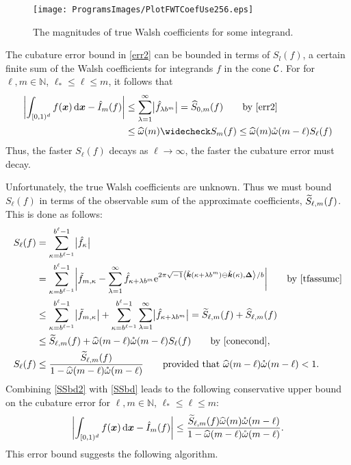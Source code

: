 \documentclass[graybox,footinfo]{svmult}
\newcommand{\N}{\mathbb{N}} %
\newcommand{\bsx}{\boldsymbol{x}}    %
\newcommand{\bsDelta}{\boldsymbol{\Delta}}    %
\begin{document}
\begin{figure}
\centering
\texttt{[image: ProgramsImages/PlotFWTCoefUse256.eps]}
\caption{The magnitudes of true Walsh coefficients for some integrand. \label{Walshcoeffig}}
\end{figure}

The cubature error bound in \eqref{err2} can be bounded in terms of $S_l(f)$, a certain finite sum of the Walsh coefficients for integrands $f$ in the cone $\mathcal{C}$.  For for $\ell, m \in \N$, $\ell_* \le \ell \le m$, it follows that 
\begin{align}
\nonumber
\biggabs{\int_{\cube} f(\bsx) \, \D \bsx - \hI_m(f) }
&\le \sum_{\lambda=1}^{\infty} \bigabs{\hf_{\lambda b^{m}}} 
= \hS_{0,m}(f) \qquad \text{by \eqref{err2}} \\
& \le \homega(m) \wcS_m(f) \le \homega(m) \wcomega(m-\ell) S_\ell(f) \label{SSbd2}
\end{align}
Thus, the faster $S_\ell(f)$ decays as $\ell \to \infty$, the faster the cubature error must decay.

Unfortunately, the true Walsh coefficients are unknown.  Thus we must bound $S_\ell(f)$ in terms of the observable sum of the approximate coefficients, $\widetilde{S}_{\ell,m}(f)$.  This is done as follows:
\begin{align}
\nonumber
S_\ell(f) &= \sum_{\kappa=b^{\ell-1}}^{b^{\ell}-1} \bigabs{ \hf_{\kappa}} \\
\nonumber
&= \sum_{\kappa=b^{\ell-1}}^{b^{\ell}-1} \biggabs{\tf_{m,\kappa} - \sum_{\lambda=1}^{\infty} \hf_{\kappa+\lambda b^{m}} \E^{2 \pi \sqrt{-1} \ip{\tvk(\kappa+\lambda b^{m}) \ominus \tvk(\kappa)}{\bsDelta}/b}} \qquad \text{by \eqref{tfassumc}}\\
\nonumber
&\le \sum_{\kappa=b^{\ell-1}}^{b^{\ell}-1} \bigabs{\tf_{m,\kappa}} + \sum_{\kappa=b^{\ell-1}}^{b^{\ell}-1} \sum_{\lambda=1}^{\infty} \bigabs{\hf_{\kappa+\lambda b^{m}}} 
= \tS_{\ell,m}(f) + \hS_{\ell,m}(f) \\
\nonumber
&\le \tS_{\ell,m}(f) + \homega(m-\ell) \wcomega(m-\ell) S_\ell(f) \qquad \text{by \eqref{conecond}}, \\
S_{\ell}(f) & \le \frac{\tS_{\ell,m}(f)}{1 - \homega(m-\ell) \wcomega(m-\ell)} \qquad \text{provided that } \homega(m-\ell) \wcomega(m-\ell) < 1. \label{SSbd}
\end{align}
Combining \eqref{SSbd2} with \eqref{SSbd} leads to the following conservative upper bound on the cubature error for $\ell, m \in \N$, $\ell_* \le \ell \le m$: 
\begin{equation}
\biggabs{\int_{\cube} f(\bsx) \, \D \bsx - \hI_m(f) }
\le \frac{\tS_{\ell,m}(f)\homega(m) \wcomega(m-\ell)}{1 - \homega(m-\ell) \wcomega(m-\ell)}. \label{errbd}
\end{equation}
This error bound suggests the following algorithm. 
\end{document}
